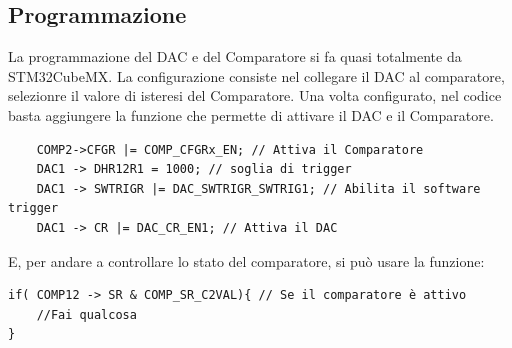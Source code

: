 \subsection{Programmazione}
La programmazione del DAC e del Comparatore si fa quasi totalmente da STM32CubeMX. La configurazione consiste nel collegare il DAC al comparatore, selezionre il valore di isteresi del Comparatore. Una volta configurato, nel codice basta aggiungere la funzione che permette di attivare il DAC e il Comparatore.\\

\begin{verbatim}
    COMP2->CFGR |= COMP_CFGRx_EN; // Attiva il Comparatore
    DAC1 -> DHR12R1 = 1000;	// soglia di trigger
	DAC1 -> SWTRIGR |= DAC_SWTRIGR_SWTRIG1; // Abilita il software trigger
	DAC1 -> CR |= DAC_CR_EN1; // Attiva il DAC
\end{verbatim}

E, per andare a controllare lo stato del comparatore, si può usare la funzione:

\begin{verbatim}
if( COMP12 -> SR & COMP_SR_C2VAL){ // Se il comparatore è attivo
    //Fai qualcosa
}
\end{verbatim}